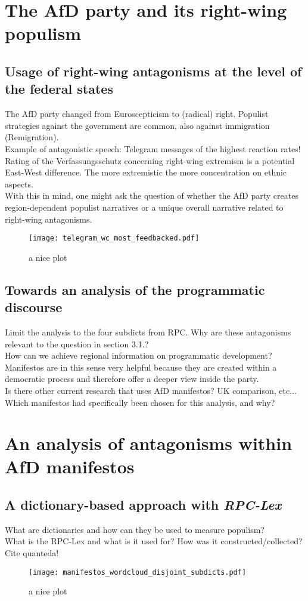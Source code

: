 \documentclass[a4paper]{scrreprt}
\begin{document}
\chapter{The AfD party and its right-wing populism}
\section{Usage of right-wing antagonisms at the level of the federal states}
The AfD party changed from Euroscepticism to (radical) right. Populist strategies against the government are common, also against immigration (Remigration).\\
Example of antagonistic speech: Telegram messages of the highest reaction rates!\\
Rating of the Verfassungsschutz concerning right-wing extremism is a potential East-West difference. The more extremistic the more concentration on ethnic aspects.\\
With this in mind, one might ask the question of whether the AfD party creates region-dependent populist narratives or a unique overall narrative related to right-wing antagonisms.
\begin{figure}
    \centering
    \texttt{[image: telegram\_wc\_most\_feedbacked.pdf]}
    \caption{a nice plot}
\end{figure}
\section{Towards an analysis of the programmatic discourse}
Limit the analysis to the four subdicts from RPC. Why are these antagonisms relevant to the question in section 3.1.?\\
How can we achieve regional information on programmatic development? Manifestos are in this sense very helpful because they are created within a democratic process and therefore offer a deeper view inside the party.\\
Is there other current research that uses AfD manifestos? UK comparison, etc...\\
Which manifestos had specifically been chosen for this analysis, and why?
\chapter{An analysis of antagonisms within AfD manifestos}
\section{A dictionary-based approach with \em RPC-Lex}
What are dictionaries and how can they be used to measure populism?\\
What is the RPC-Lex and what is it used for? How was it constructed/collected?\\
Cite quanteda!
\begin{figure}
    \centering
    \texttt{[image: manifestos\_wordcloud\_disjoint\_subdicts.pdf]}
    \caption{a nice plot}
\end{figure}
\end{document}
